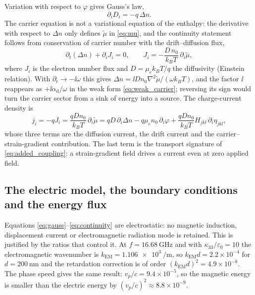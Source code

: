 Variation with respect to $\varphi$ gives Gauss's law,
\begin{equation}
\label{eq:gauss}
\partial_iD_i=-q\,\Delta n .
\end{equation}
The carrier equation is not a variational equation of the enthalpy: the derivative with respect to $\Delta n$ only defines $\widetilde\mu$ in \eqref{eq:mu}, and the continuity statement follows from conservation of carrier number with the drift--diffusion flux,
\begin{equation}
\label{eq:continuity}
\partial_t(\Delta n)+\partial_iJ_i=0,
\qquad
J_i=-\frac{D\,n_0}{k_BT}\,\partial_i\widetilde\mu ,
\end{equation}
where $J_i$ is the electron number flux and $D=\mu_ek_BT/q$ the diffusivity (Einstein relation).  With $\partial_t\to-\ii\omega$ this gives $\Delta n=\ii D n_0\nabla^{2}\widetilde\mu/(\omega k_BT)$, and the factor $\ii$ reappears as $+\ii\alpha_{\mathrm d}/\omega$ in the weak form \eqref{eq:weak_carrier}; reversing its sign would turn the carrier sector from a sink of energy into a source.  The charge-current density is
\begin{equation}
\label{eq:current}
j_i=-qJ_i=\frac{qDn_0}{k_BT}\,\partial_i\widetilde\mu
=qD\,\partial_i\Delta n-q\mu_e n_0\,\partial_i\varphi
+\frac{qDn_0}{k_BT}H_{jkl}\,\partial_i\eta_{jkl},
\end{equation}
whose three terms are the diffusion current, the drift current and the carrier--strain-gradient contribution.  The last term is the transport signature of \eqref{eq:added_coupling}: a strain-gradient field drives a current even at zero applied field.

\subsection{The electric model, the boundary conditions and the energy flux}
\label{sec:governing_electric}
\label{sec:governing_bc}
\label{sec:governing_energy}

Equations \eqref{eq:gauss}--\eqref{eq:continuity} are electrostatic: no magnetic induction, displacement current or electromagnetic radiation mode is retained.  This is justified by the ratios that control it.  At $f=\SI{16.68}{\giga\hertz}$ and with $\kappa_{33}/\varepsilon_0=10$ the electromagnetic wavenumber is $k_{\mathrm{EM}}=\SI{1.106e3}{\per\metre}$, so $k_{\mathrm{EM}}d=2.2\times10^{-4}$ for $d=\SI{200}{\nano\metre}$ and the retardation correction is of order $(k_{\mathrm{EM}}d)^2=4.9\times10^{-8}$.  The phase speed gives the same result: $v_p/c=9.4\times10^{-5}$, so the magnetic energy is smaller than the electric energy by $(v_p/c)^2\approx8.8\times10^{-9}$.

